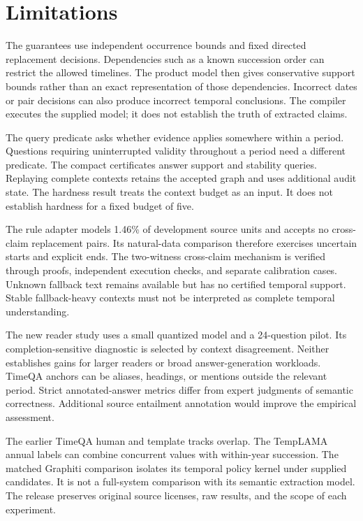 \section*{Limitations}
The guarantees use independent occurrence bounds and fixed directed replacement decisions.
Dependencies such as a known succession order can restrict the allowed timelines.
The product model then gives conservative support bounds rather than an exact representation of those dependencies.
Incorrect dates or pair decisions can also produce incorrect temporal conclusions.
The compiler executes the supplied model; it does not establish the truth of extracted claims.

The query predicate asks whether evidence applies somewhere within a period.
Questions requiring uninterrupted validity throughout a period need a different predicate.
The compact certificates answer support and stability queries.
Replaying complete contexts retains the accepted graph and uses additional audit state.
The hardness result treats the context budget as an input.
It does not establish hardness for a fixed budget of five.

The rule adapter models 1.46\% of development source units and accepts no cross-claim replacement pairs.
Its natural-data comparison therefore exercises uncertain starts and explicit ends.
The two-witness cross-claim mechanism is verified through proofs, independent execution checks, and separate calibration cases.
Unknown fallback text remains available but has no certified temporal support.
Stable fallback-heavy contexts must not be interpreted as complete temporal understanding.

The new reader study uses a small quantized model and a 24-question pilot.
Its completion-sensitive diagnostic is selected by context disagreement.
Neither establishes gains for larger readers or broad answer-generation workloads.
TimeQA anchors can be aliases, headings, or mentions outside the relevant period.
Strict annotated-answer metrics differ from expert judgments of semantic correctness.
Additional source entailment annotation would improve the empirical assessment.

The earlier TimeQA human and template tracks overlap.
The TempLAMA annual labels can combine concurrent values with within-year succession.
The matched Graphiti comparison isolates its temporal policy kernel under supplied candidates.
It is not a full-system comparison with its semantic extraction model.
The release preserves original source licenses, raw results, and the scope of each experiment.
